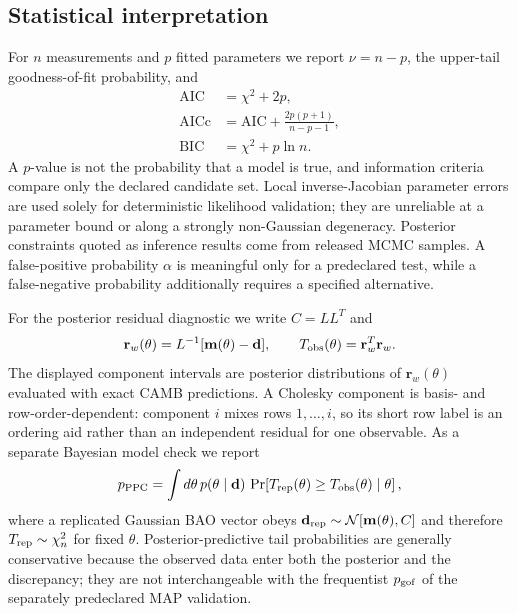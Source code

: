 \subsection{Statistical interpretation}
For $n$ measurements and $p$ fitted parameters we report $\nu=n-p$, the upper-tail goodness-of-fit probability, and
\begin{align}
\mathrm{AIC}&=\chi^2+2p,\\
\mathrm{AICc}&=\mathrm{AIC}+\frac{2p(p+1)}{n-p-1},\\
\mathrm{BIC}&=\chi^2+p\ln n.
\end{align}
A $p$-value is not the probability that a model is true, and information criteria compare only the declared candidate set. Local inverse-Jacobian parameter errors are used solely for deterministic likelihood validation; they are unreliable at a parameter bound or along a strongly non-Gaussian degeneracy. Posterior constraints quoted as inference results come from released MCMC samples. A false-positive probability $\alpha$ is meaningful only for a predeclared test, while a false-negative probability additionally requires a specified alternative.

For the posterior residual diagnostic we write $C=LL^T$ and
\begin{equation}
\mathbf r_w(\theta)=L^{-1}[\mathbf m(\theta)-\mathbf d],\qquad
T_{\rm obs}(\theta)=\mathbf r_w^T\mathbf r_w.
\end{equation}
The displayed component intervals are posterior distributions of $\mathbf r_w(\theta)$ evaluated with exact CAMB predictions. A Cholesky component is basis- and row-order-dependent: component $i$ mixes rows $1,\ldots,i$, so its short row label is an ordering aid rather than an independent residual for one observable. As a separate Bayesian model check we report
\begin{equation}
p_{\rm PPC}=\int d\theta\,p(\theta\mid\mathbf d)\,
\Pr\!\left[T_{\rm rep}(\theta)\ge T_{\rm obs}(\theta)\mid\theta\right],
\end{equation}
where a replicated Gaussian BAO vector obeys $\mathbf d_{\rm rep}\sim\mathcal N[\mathbf m(\theta),C]$ and therefore $T_{\rm rep}\sim\chi^2_n$ for fixed $\theta$. Posterior-predictive tail probabilities are generally conservative because the observed data enter both the posterior and the discrepancy; they are not interchangeable with the frequentist $p_{\rm gof}$ of the separately predeclared MAP validation.

